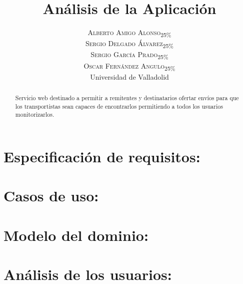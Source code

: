 \documentclass[10pt, a4paper,spanish]{article}
\title{\vspace{-15mm}\fontsize{24pt}{10pt}\selectfont\textbf{Análisis de la Aplicación}} %
\author{
\large
\textsc{Alberto Amigo Alonso\textsubscript{25\%}}\\[2mm] %
\textsc{Sergio Delgado Álvarez\textsubscript{25\%}}\\[2mm] %
\textsc{Sergio García Prado\textsubscript{25\%}}\\[2mm] %
\textsc{Oscar Fernández Angulo\textsubscript{25\%}}\\[2mm] %
\normalsize Universidad de Valladolid \\ %
\vspace{-5mm}
}
\date{}
\begin{document}
	\maketitle %

	\thispagestyle{fancy} %


	\begin{abstract}
		\noindent Servicio web destinado a permitir a remitentes y destinatarios ofertar envíos para que los transportistas sean capaces de encontrarlos permitiendo a todos los usuarios monitorizarlos.
	\end{abstract}

	\section{Especificación de requisitos:}

		\paragraph{}


	\section{Casos de uso:}

		\paragraph{}


	\section{Modelo del dominio:}

		\paragraph{}


	\section{Análisis de los usuarios:}
\end{document}
